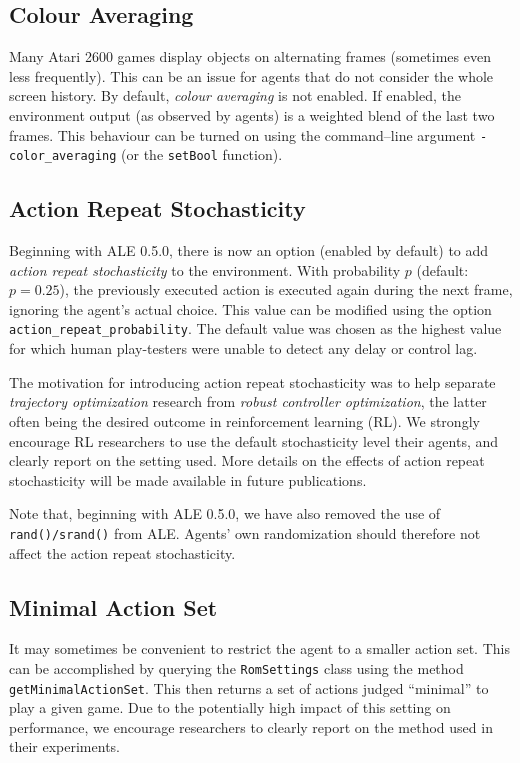 \documentclass[12pt]{article}
\begin{document}
\subsection{Colour Averaging}

Many Atari 2600 games display objects on alternating frames (sometimes even less frequently).
This can be an issue for agents that do not consider the whole screen history. By default, 
\emph{colour averaging} is not enabled. If enabled, the environment output (as observed by agents)
is a weighted blend of the last two frames. This behaviour can be turned on using the
command--line argument \verb+-color_averaging+ (or the \verb+setBool+ function).

\subsection{Action Repeat Stochasticity}

Beginning with ALE 0.5.0, there is now an option (enabled by default) to add 
\emph{action repeat stochasticity} to the environment. With probability $p$ (default: $p = 0.25$),
the previously executed action is executed again during the next frame, ignoring the agent's
actual choice. This value can be modified using the option \verb+action_repeat_probability+.
The default value was chosen as the highest value for which human play-testers
were unable to detect any delay or control lag.

The motivation for introducing action repeat stochasticity was to help separate \emph{trajectory
optimization} research from \emph{robust controller optimization}, the latter often being the 
desired outcome in reinforcement learning (RL). We strongly encourage RL researchers to use 
the default stochasticity level their agents, and clearly report on the setting used. More 
details on the effects of action repeat stochasticity will be made available in future 
publications.

Note that, beginning with ALE 0.5.0, we have also removed the use of \verb+rand()/srand()+ from
ALE. Agents' own randomization should therefore not affect the action repeat stochasticity.

\subsection{Minimal Action Set}

It may sometimes be convenient to restrict the agent to a smaller action set. This can be
accomplished by querying the \verb+RomSettings+ class using the method 
\verb+getMinimalActionSet+. This then returns a set of actions judged ``minimal'' to play a given
game. Due to the potentially high impact of this setting on performance, we encourage researchers
to clearly report on the method used in their experiments. 
\end{document}
